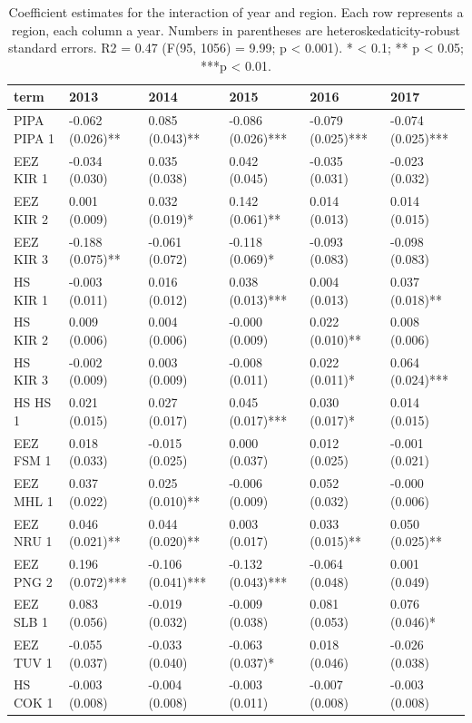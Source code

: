 \documentclass[11pt,english]{article}
\begin{document}
\begin{table}

\caption{\label{tab:unnamed-chunk-16}\label{tab:mean_change}Coefficient estimates for the interaction of year and region. Each row represents a region, each column a year. Numbers in parentheses are heteroskedaticity-robust standard errors. R2 = 0.47 (F(95, 1056) = 9.99; p < 0.001). * < 0.1; ** p < 0.05; ***p < 0.01.}
\centering
\begin{tabular}[t]{llllll}
\toprule
term & 2013 & 2014 & 2015 & 2016 & 2017\\
\midrule
PIPA PIPA 1 & -0.062 (0.026)** & 0.085 (0.043)** & -0.086 (0.026)*** & -0.079 (0.025)*** & -0.074 (0.025)***\\
EEZ KIR 1 & -0.034 (0.030) & 0.035 (0.038) & 0.042 (0.045) & -0.035 (0.031) & -0.023 (0.032)\\
EEZ KIR 2 & 0.001 (0.009) & 0.032 (0.019)* & 0.142 (0.061)** & 0.014 (0.013) & 0.014 (0.015)\\
EEZ KIR 3 & -0.188 (0.075)** & -0.061 (0.072) & -0.118 (0.069)* & -0.093 (0.083) & -0.098 (0.083)\\
HS KIR 1 & -0.003 (0.011) & 0.016 (0.012) & 0.038 (0.013)*** & 0.004 (0.013) & 0.037 (0.018)**\\
\addlinespace
HS KIR 2 & 0.009 (0.006) & 0.004 (0.006) & -0.000 (0.009) & 0.022 (0.010)** & 0.008 (0.006)\\
HS KIR 3 & -0.002 (0.009) & 0.003 (0.009) & -0.008 (0.011) & 0.022 (0.011)* & 0.064 (0.024)***\\
HS HS 1 & 0.021 (0.015) & 0.027 (0.017) & 0.045 (0.017)*** & 0.030 (0.017)* & 0.014 (0.015)\\
EEZ FSM 1 & 0.018 (0.033) & -0.015 (0.025) & 0.000 (0.037) & 0.012 (0.025) & -0.001 (0.021)\\
EEZ MHL 1 & 0.037 (0.022) & 0.025 (0.010)** & -0.006 (0.009) & 0.052 (0.032) & -0.000 (0.006)\\
\addlinespace
EEZ NRU 1 & 0.046 (0.021)** & 0.044 (0.020)** & 0.003 (0.017) & 0.033 (0.015)** & 0.050 (0.025)**\\
EEZ PNG 2 & 0.196 (0.072)*** & -0.106 (0.041)*** & -0.132 (0.043)*** & -0.064 (0.048) & 0.001 (0.049)\\
EEZ SLB 1 & 0.083 (0.056) & -0.019 (0.032) & -0.009 (0.038) & 0.081 (0.053) & 0.076 (0.046)*\\
EEZ TUV 1 & -0.055 (0.037) & -0.033 (0.040) & -0.063 (0.037)* & 0.018 (0.046) & -0.026 (0.038)\\
HS COK 1 & -0.003 (0.008) & -0.004 (0.008) & -0.003 (0.011) & -0.007 (0.008) & -0.003 (0.008)\\
\bottomrule
\end{tabular}
\end{table}
\end{document}
